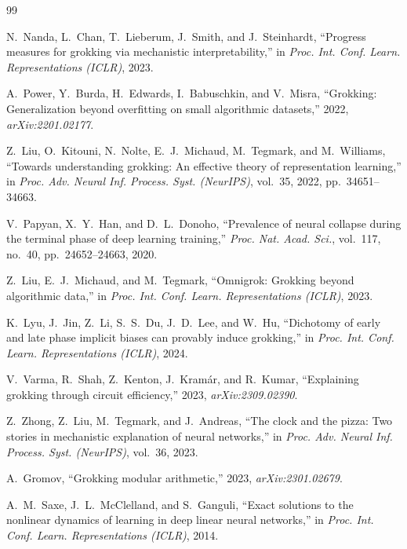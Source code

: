 \documentclass[12pt,openany,a4paper]{book}
\begin{document}
{\renewcommand{\bibname}{References}%
\begin{thebibliography}{99}

N.~Nanda, L.~Chan, T.~Lieberum, J.~Smith, and J.~Steinhardt,
``Progress measures for grokking via mechanistic interpretability,''
in \textit{Proc. Int. Conf. Learn. Representations (ICLR)}, 2023.

A.~Power, Y.~Burda, H.~Edwards, I.~Babuschkin, and V.~Misra,
``Grokking: Generalization beyond overfitting on small algorithmic
datasets,'' 2022, \textit{arXiv:2201.02177}.

Z.~Liu, O.~Kitouni, N.~Nolte, E.~J.~Michaud, M.~Tegmark, and
M.~Williams, ``Towards understanding grokking: An effective theory
of representation learning,'' in \textit{Proc. Adv. Neural Inf.
Process. Syst. (NeurIPS)}, vol.~35, 2022, pp.~34651--34663.

V.~Papyan, X.~Y.~Han, and D.~L.~Donoho,
``Prevalence of neural collapse during the terminal phase of
deep learning training,''
\textit{Proc. Nat. Acad. Sci.}, vol.~117, no.~40,
pp.~24652--24663, 2020.

Z.~Liu, E.~J.~Michaud, and M.~Tegmark,
``Omnigrok: Grokking beyond algorithmic data,''
in \textit{Proc. Int. Conf. Learn. Representations (ICLR)}, 2023.

K.~Lyu, J.~Jin, Z.~Li, S.~S.~Du, J.~D.~Lee, and W.~Hu,
``Dichotomy of early and late phase implicit biases can provably
induce grokking,''
in \textit{Proc. Int. Conf. Learn. Representations (ICLR)}, 2024.

V.~Varma, R.~Shah, Z.~Kenton, J.~Kram\'{a}r, and R.~Kumar,
``Explaining grokking through circuit efficiency,''
2023, \textit{arXiv:2309.02390}.

Z.~Zhong, Z.~Liu, M.~Tegmark, and J.~Andreas,
``The clock and the pizza: Two stories in mechanistic explanation
of neural networks,''
in \textit{Proc. Adv. Neural Inf. Process. Syst. (NeurIPS)},
vol.~36, 2023.

A.~Gromov,
``Grokking modular arithmetic,''
2023, \textit{arXiv:2301.02679}.

A.~M.~Saxe, J.~L.~McClelland, and S.~Ganguli,
``Exact solutions to the nonlinear dynamics of learning in deep
linear neural networks,''
in \textit{Proc. Int. Conf. Learn. Representations (ICLR)}, 2014.


\end{thebibliography}}
\end{document}
